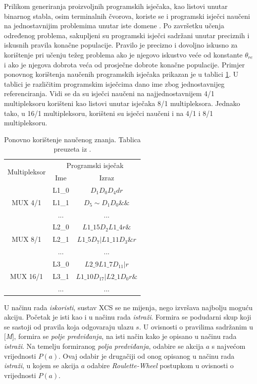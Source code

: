 \documentclass[times, utf8, zavrsni]{fer}
\begin{document}
Prilikom generiranja proizvoljnih programskih isječaka, kao listovi unutar binarnog stabla, osim terminalnih čvorova, koriste se i programski isječci naučeni na jednostavnijim problemima unutar iste domene \citep{4}.
Po završetku učenja određenog problema, sakupljeni su programski isječci sadržani unutar preciznih i iskusnih pravila konačne populacije.
Pravilo je precizno i dovoljno iskusno za korištenje pri učenju težeg problema ako je njegovo iskustvo veće od konstante $\theta_{re}$ i ako je njegova dobrota veća od prosječne dobrote konačne populacije.
Primjer ponovnog korištenja naučenih programskih isječaka prikazan je u tablici \ref{tbl:reuse}.
U tablici je različitim programskim isječcima dano ime zbog jednostavnijeg referenciranja.
Vidi se da su isječci naučeni na najjednostavnijem 4/1 multipleksoru korišteni kao listovi unutar isječaka 8/1 multipleksora.
Jednako tako, u 16/1 multipleksoru, korišteni su isječci naučeni i na 4/1 i 8/1 multipleksoru.
\begin{table}[!htb]
    \caption{Ponovno korištenje naučenog znanja. Tablica preuzeta iz \citep{4}.}
    \label{tbl:reuse}
    \centering
    \begin{tabular}{c | c | c}
        \multirow{2}{*}{Multipleksor} & \multicolumn{2}{c}{Programski isječak} \\
        & Ime & Izraz \\ \hline
        \multirow{3}{*}{MUX 4/1} & L1\_0 & $D_{1}D_{0}D_{4}dr$ \\
        & L1\_1 & $D_{5}\sim D_{1}D_{0}\&\&$ \\
        & ... & ... \\ \hline
        \multirow{3}{*}{MUX 8/1} & L2\_0 & $L1\_15D_{2}L1\_4r\&$ \\
        & L2\_1 & $L1\_5D_{7}|L1\_11D_{3}\&r$ \\
        & ... & ... \\ \hline
        \multirow{3}{*}{MUX 16/1} & L3\_0 & $L2\_9L1\_7D_{11}|r$ \\
        & L3\_1 & $L1\_10D_{17}|L2\_1D_{0}r\&$ \\
        & ... & ... \\
    \end{tabular}
\end{table}

U načinu rada \emph{iskoristi}, sustav XCS se ne mijenja, nego izvršava najbolju moguću akciju.
Početak je isti kao i u načinu rada \emph{istraži}.
Formira se podudarni skup koji se sastoji od pravila koja odgovaraju ulazu $s$.
U ovisnosti o pravilima sadržanim u [\emph{M}], formira se \emph{polje predviđanja}, na isti način kako je opisano u načinu rada \emph{istraži}.
Na temelju formiranog \emph{polja predviđanja}, odabire se akcija $a$ s najvećom vrijednosti $P(a)$.
Ovaj odabir je drugačiji od onog opisanog u načinu rada \emph{istraži}, u kojem se akcija $a$ odabire \emph{Roulette-Wheel} postupkom u ovisnosti o vrijednosti $P(a)$.
\end{document}
